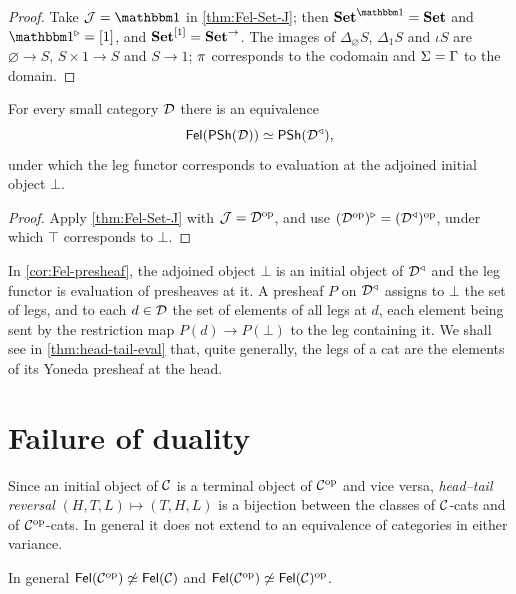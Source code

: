 \begin{proof}
Take $\cJ=\one$ in \cref{thm:Fel-Set-J}; then $\Set^{\one}=\Set$ and
$\one^{\triangleright}=[1]$, and $\mathbf{Set}^{[1]}=\mathbf{Set}^{\to}$. The images of
$\Delta_\varnothing S$, $\Delta_1S$ and $\iota S$ are $\varnothing\to S$,
$S\times1\to S$ and $S\to1$; $\pi$ corresponds to the codomain and
$\Sigma=\Gamma$ to the domain.
\end{proof}

\begin{corollary}\label{cor:Fel-presheaf}
For every small category $\mathcal{D}$ there is an equivalence
\[
\mathsf{Fel}(\mathsf{PSh}(\mathcal{D}))\simeq\mathsf{PSh}(\mathcal{D}^{\triangleleft}),
\]
under which the leg functor
corresponds to evaluation at the adjoined initial object $\bot$.
\end{corollary}

\begin{proof}
Apply \cref{thm:Fel-Set-J} with $\mathcal{J}=\mathcal{D}^{\mathrm{op}}$, and use
$(\mathcal{D}^{\mathrm{op}})^{\triangleright}=(\mathcal{D}^{\triangleleft})^{\mathrm{op}}$, under which $\top$
corresponds to $\bot$.
\end{proof}

\begin{remark}\label{rem:presheaf-head}
In \cref{cor:Fel-presheaf}, the adjoined object $\bot$ is an initial object of
$\mathcal{D}^{\triangleleft}$ and the leg functor is evaluation of presheaves at it. A
presheaf $P$ on $\mathcal{D}^{\triangleleft}$ assigns to $\bot$ the set of legs, and to
each $d\in\mathcal{D}$ the set of elements of all legs at $d$, each element being sent
by the restriction map $P(d)\to P(\bot)$ to the leg containing it. We shall
see in \cref{thm:head-tail-eval} that, quite generally, the legs of a cat are
the elements of its Yoneda presheaf at the head.
\end{remark}

\section{Failure of duality}\label{sec:duality}

Since an initial object of $\mathcal{C}$ is a terminal object of $\mathcal{C}^{\mathrm{op}}$ and vice
versa, \emph{head--tail reversal} $(H,T,L)\mapsto(T,H,L)$ is a bijection
between the classes of $\mathcal{C}$-cats and of $\mathcal{C}^{\mathrm{op}}$-cats. In general it does
not extend to an equivalence of categories in either variance.

\begin{proposition}\label{prop:no-duality}
In general $\mathsf{Fel}(\mathcal{C}^{\mathrm{op}})\not\simeq\mathsf{Fel}(\mathcal{C})$ and
$\mathsf{Fel}(\mathcal{C}^{\mathrm{op}})\not\simeq\mathsf{Fel}(\mathcal{C})^{\mathrm{op}}$.
\end{proposition}

